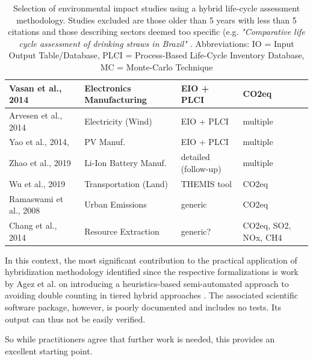 \documentclass{article}
\begin{document}
\begin{table}[H]
\begin{tabularx}{\textwidth}{| X | X | X | X |}
                \hline
                    Vasan et al., 2014 \cite{vasan_carbon_2014} & Electronics Manufacturing & EIO + PLCI & CO2eq \\
                \hline
                    Arvesen et al., 2014 \cite{arvesen_life_2014} & Electricity (Wind) & EIO + PLCI & multiple \\
                \hline
                    Yao et al., 2014, \cite{yao_hybrid_2014} & PV Manuf. & EIO + PLCI & multiple \\
                \hline
                    Zhao et al., 2019 \cite{zhao_comparative_2019} & Li-Ion Battery Manuf. & detailed (follow-up) & multiple \\
                \hline
                    Wu et al., 2019 \cite{wu_assessing_2019} & Transportation (Land) & THEMIS tool \cite{gibon_methodology_2015} & CO2eq \\
                \hline
                    Ramaswami et al., 2008 \cite{ramaswami_demand-centered_2008} & Urban Emissions & generic & CO2eq \\
                \hline
                    Chang et al., 2014 \cite{chang_shale--well_2014} & Resource Extraction & generic? & CO2eq, SO2, NOx, CH4 \\
                \hline
            \end{tabularx}
            \caption{Selection of environmental impact studies using a hybrid life-cycle assessment methodology. Studies excluded are those older than 5 years with less than 5 citations and those describing sectors deemed too specific (e.g. \textit{"Comparative life cycle assessment of drinking straws in Brazil" \cite{zanghelini_comparative_2020}}. Abbreviations: IO = Input Output Table/Database, PLCI = Process-Based Life-Cycle Inventory Database, MC = Monte-Carlo Technique}
            \label{tab_studies}
        \end{table}
        
        In this context, the most significant contribution to the practical application of hybridization methodology identified since the respective formalizations is work by Agez et al. on introducing a heuristics-based semi-automated approach to avoiding double counting in tiered hybrid approaches \cite{agez_lifting_2019}\cite{agez_hybridization_2020}\cite{agez_correcting_2022}. The associated scientific software package, however, is poorly documented and includes no tests. Its output can thus not be easily verified.
        
        So while practitioners agree that further work is needed, this provides an excellent starting point.
\end{document}
